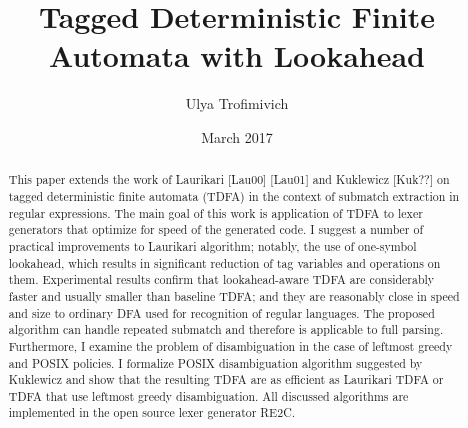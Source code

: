 \documentclass{article}
\title{Tagged Deterministic Finite Automata with Lookahead}
\author{Ulya Trofimivich}
\date{March 2017}
\theoremstyle{definition}
\begin{document}
\maketitle

\begin{abstract}
\noindent
This paper extends the work of Laurikari [Lau00] [Lau01] and Kuklewicz [Kuk??] on tagged deterministic finite automata (TDFA)
in the context of submatch extraction in regular expressions.
The main goal of this work is application of TDFA to lexer generators that optimize for speed of the generated code.
I suggest a number of practical improvements to Laurikari algorithm;
notably, the use of one-symbol lookahead, which results in significant reduction of tag variables and operations on them.
Experimental results confirm that lookahead-aware TDFA are considerably faster and usually smaller than baseline TDFA;
and they are reasonably close in speed and size to ordinary DFA used for recognition of regular languages.
The proposed algorithm can handle repeated submatch and therefore is applicable to full parsing.
Furthermore, I examine the problem of disambiguation in the case of leftmost greedy and POSIX policies.
I formalize POSIX disambiguation algorithm suggested by Kuklewicz
and show that the resulting TDFA are as efficient as Laurikari TDFA or TDFA that use leftmost greedy disambiguation.
All discussed algorithms are implemented in the open source lexer generator RE2C.
\end{abstract}
\end{document}
